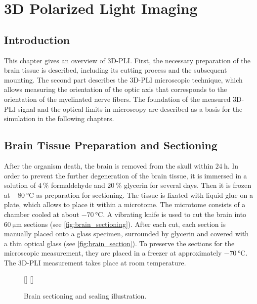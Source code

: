\cleardoublepage
\setcounter{chapter}{3}
\chapter{3D Polarized Light Imaging}
\label{sec:pli}
%
\section{Introduction}
%
This chapter gives an overview of \ac{3D-PLI}.
First, the necessary preparation of the brain tissue is described, including its cutting process and the subsequent mounting.
The second part describes the \ac{3D-PLI} microscopic technique, which allows measuring the orientation of the optic axis that corresponds to the orientation of the myelinated nerve fibers.
The foundation of the measured \ac{3D-PLI} signal and the optical limits in microscopy are described as a basis for the simulation in the following chapters.
%
%
%
\section{Brain Tissue Preparation and Sectioning}
%
After the organism death, the brain is removed from the skull within $\SI{24}{\hour}$.
In order to prevent the further degeneration of the brain tissue, it is immersed in a solution of $\SI{4}{\percent}$ formaldehyde and $\SI{20}{\percent}$ glycerin for several days.
Then it is frozen at $\SI{-80}{\celsius}$ as preparation for sectioning.
The tissue is fixated with liquid glue on a plate, which allows to place it within a microtome.
The microtome consists of a chamber cooled at about $\SI{-70}{\celsius}$.
A vibrating knife is used to cut the brain into $\SI{60}{\micro\meter}$ sections (see \cref{fig:brain_sectioning}).
After each cut, each section is manually placed onto a glass specimen, surrounded by glycerin and covered with a thin optical glass (see \cref{fig:brain_section}).
To preserve the sections for the microscopic measurement, they are placed in a freezer at approximately $\SI{-70}{\celsius}$.
The \ac{3D-PLI} measurement takes place at room temperature. \cite{Axer2011}
%
\begin{figure}[!t]
	\centering
    \setlength{\tikzwidth}{0.475\textwidth}
    [\tikzwidth]{}
    \hfill
    [\tikzwidth]{}
	\caption[]{Brain sectioning and sealing illustration.}
\end{figure}
%
%
%
